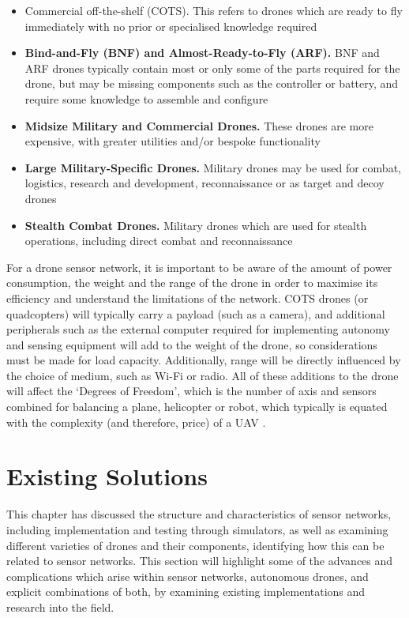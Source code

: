 \begin{itemize}
\item Commercial off-the-shelf (COTS). This refers to drones which are ready to fly immediately with no prior or specialised knowledge required
\item\textbf{ Bind-and-Fly (BNF) and Almost-Ready-to-Fly (ARF).}  BNF and ARF drones typically contain most or only some of the parts required for the drone, but may be missing components such as the controller or battery, and require some knowledge to assemble and configure
\item \textbf{Midsize Military and Commercial Drones.} These drones are more expensive, with greater utilities and/or bespoke functionality
\item \textbf{Large Military-Specific Drones.} Military drones may be used for combat, logistics, research and development, reconnaissance or as target and decoy drones
\item \textbf{Stealth Combat Drones.} Military drones which are used for stealth operations, including direct combat and reconnaissance

\end{itemize}
For a drone sensor network, it is important to be aware of the amount of power consumption, the weight and the range of the drone in order to maximise its efficiency and understand the limitations of the network. COTS drones (or quadcopters) will typically carry a payload (such as a camera), and additional peripherals such as the external computer required for implementing autonomy and sensing equipment will add to the weight of the drone, so considerations must be made for load capacity. Additionally, range will be directly influenced by the choice of medium, such as Wi-Fi or radio. All of these additions to the drone will affect the ‘Degrees of Freedom’, which is the number of axis and sensors combined for balancing a plane, helicopter or robot, which typically is equated with the complexity (and therefore, price) of a UAV \cite{arduinodof2012}.

\section{Existing Solutions}
This chapter has discussed the structure and characteristics of sensor networks, including implementation and testing through simulators, as well as examining different varieties of drones and their components, identifying how this can be related to sensor networks. This section will highlight some of the advances and complications which arise within sensor networks, autonomous drones, and explicit combinations of both, by examining existing implementations and research into the field.

